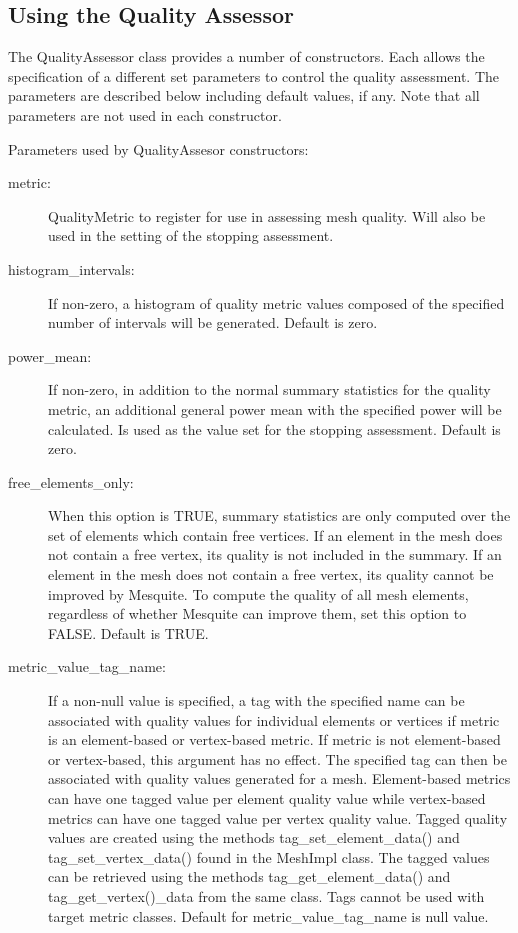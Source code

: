 \subsection{Using the Quality Assessor}
\label{sec:using_qa}

  The QualityAssessor class provides a number of constructors.	Each allows the specification of a different set parameters to control the quality assessment.	The parameters are described below including default values, if any. Note that all parameters are not used in each constructor.

\label{QA_params}
Parameters used by QualityAssesor constructors:
\begin{description}
\item[metric:]	 QualityMetric to register for use in assessing mesh quality.  Will also be used in the setting of the stopping assessment.

\item[histogram\_intervals:]   If non-zero, a histogram of quality metric values composed of the specified number of intervals will be generated.  Default is zero.
\item[power\_mean:] If non-zero, in addition to the normal summary statistics for the quality metric, an additional general power mean with the specified power will be calculated.  Is used as the value set for the stopping assessment.  Default is zero.

\item[free\_elements\_only:] When this option is TRUE, summary statistics are only computed over the set of elements which contain free vertices. If an element in the mesh does not contain a free vertex, its quality is not included in the summary.	 If an element in the mesh does not contain a free vertex, its quality cannot be improved by Mesquite.	To compute the quality of all mesh elements, regardless of whether Mesquite can improve them, set this option to FALSE.	 Default is TRUE.

\item[metric\_value\_tag\_name:] If a non-null value is specified, a tag with the specified name can be associated with quality values for individual elements or vertices if metric is an element-based or vertex-based metric.  If metric is not element-based or vertex-based, this argument has no effect. The specified tag can then be associated with quality values generated for a mesh.  Element-based metrics can have one tagged value per element quality value while vertex-based metrics can have one tagged value per vertex quality value.  Tagged quality values are created using the methods tag\_set\_element\_data() and tag\_set\_vertex\_data() found in the MeshImpl class. The tagged values can be retrieved using the methods tag\_get\_element\_data() and tag\_get\_vertex()\_data from the same class.  Tags cannot be used with target metric classes. Default for metric\_value\_tag\_name is null value.


\end{description}
